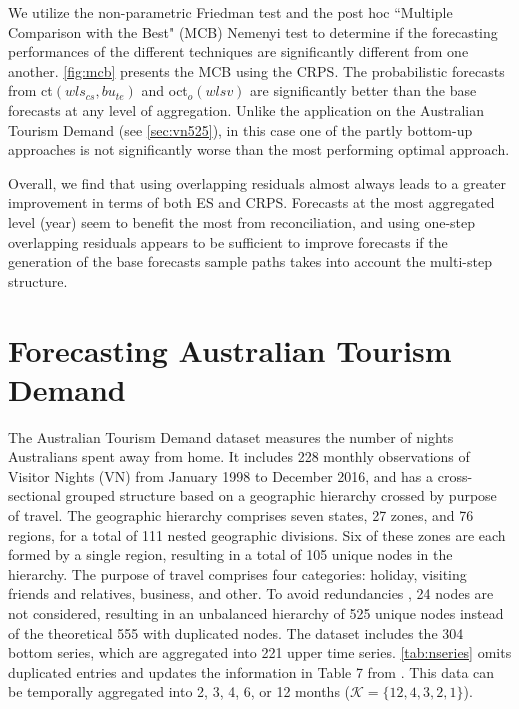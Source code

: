 \documentclass[review, 11pt]{elsarticle}
\theoremstyle{definition}
\begin{document}
We utilize the non-parametric Friedman test and the post hoc “Multiple Comparison with the Best" (MCB) Nemenyi test \citep{koning2005, kourentzes2019, makridakis2022, tsutils} to determine if the forecasting performances of the different techniques are significantly different from one another.
\autoref{fig:mcb} presents the MCB using the CRPS. The probabilistic forecasts from ct$(wls_{cs},bu_{te})$ and oct$_o(wlsv)$ are significantly better than the base forecasts at any level of aggregation. Unlike the application on the Australian Tourism Demand (see \autoref{sec:vn525}), in this case one of the partly bottom-up approaches is not significantly worse than the most performing optimal approach.

Overall, we find that using overlapping residuals almost always leads to a greater improvement in terms of both ES and CRPS. %
Forecasts at the most aggregated level (year) seem to benefit the most from reconciliation, and using one-step overlapping residuals appears to be sufficient to improve forecasts if the generation of the base forecasts sample paths takes into account the multi-step structure.



\section{Forecasting Australian Tourism Demand}\label{sec:vn525}

The Australian Tourism Demand dataset \citep{wickramasuriya2019} measures the number of nights Australians spent away from home. It includes 228 monthly observations of Visitor Nights (VN) from January 1998 to December 2016, and has a cross-sectional grouped structure based on a geographic hierarchy crossed by purpose of travel. The geographic hierarchy comprises seven states, 27 zones, and 76 regions, for a total of 111 nested geographic divisions. Six of these zones are each formed by a single region, resulting in a total of 105 unique nodes in the hierarchy. The purpose of travel comprises four categories: holiday, visiting friends and relatives, business, and other.
To avoid redundancies \citep{difonzo2022a}, 24 nodes are not considered, resulting in an unbalanced hierarchy of 525 unique nodes instead of the theoretical 555 with duplicated nodes.
The dataset includes the 304 bottom series, which are aggregated into 221 upper time series. \autoref{tab:nseries} omits duplicated entries and updates the information in Table 7 from \cite{wickramasuriya2019}. This data can be temporally aggregated into 2, 3, 4, 6, or 12 months ($\mathcal{K} = \{12,4,3,2,1\}$).
\end{document}
